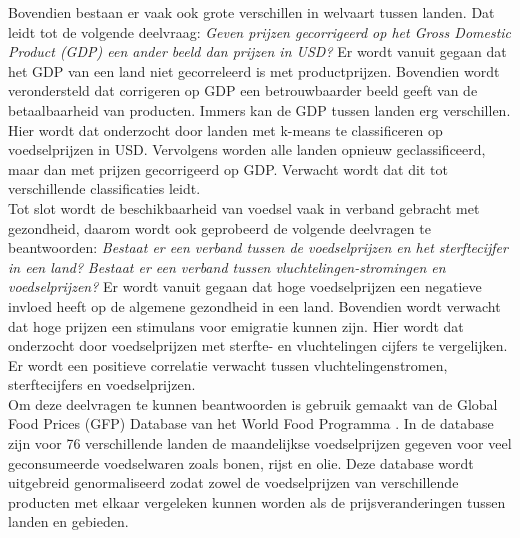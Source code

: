 \documentclass{article}
\begin{document}
Bovendien bestaan er vaak ook grote verschillen in welvaart tussen landen. Dat leidt tot de volgende deelvraag:
\textit{Geven prijzen gecorrigeerd op het Gross Domestic Product (GDP) een ander beeld dan prijzen in USD?}
Er wordt vanuit gegaan dat het GDP van een land niet gecorreleerd is met productprijzen.
Bovendien wordt verondersteld  dat corrigeren op GDP een betrouwbaarder beeld geeft van de betaalbaarheid van producten. Immers kan de GDP tussen landen erg verschillen. Hier wordt dat onderzocht door landen met k-means te classificeren op voedselprijzen in USD. Vervolgens worden alle landen opnieuw geclassificeerd, maar dan met prijzen gecorrigeerd op GDP. Verwacht wordt dat dit tot verschillende classificaties leidt.\\


Tot slot wordt de beschikbaarheid van voedsel vaak in verband gebracht met gezondheid, daarom wordt ook geprobeerd de volgende deelvragen te beantwoorden: 
\textit{Bestaat er een verband tussen de voedselprijzen en het sterftecijfer in een land?}
\textit{Bestaat er een verband tussen vluchtelingen-stromingen en voedselprijzen?} 
Er wordt vanuit gegaan dat hoge voedselprijzen een negatieve invloed heeft op de algemene gezondheid in een land. Bovendien wordt verwacht dat hoge prijzen een stimulans voor emigratie kunnen zijn. Hier wordt dat onderzocht door voedselprijzen met sterfte- en vluchtelingen cijfers te vergelijken. Er wordt een positieve correlatie verwacht tussen vluchtelingenstromen, sterftecijfers en voedselprijzen. \\

Om deze deelvragen te kunnen beantwoorden is gebruik gemaakt van de Global Food Prices (GFP) Database  van het World Food Programma \cite{wfp}. In de database zijn voor 76 verschillende landen de maandelijkse voedselprijzen gegeven voor veel geconsumeerde voedselwaren zoals bonen, rijst en olie. Deze database wordt uitgebreid genormaliseerd zodat zowel de voedselprijzen van verschillende producten met elkaar vergeleken kunnen worden als de prijsveranderingen tussen landen en gebieden. \\
\end{document}
